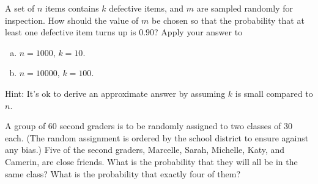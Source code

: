 \documentclass[12pt]{elegantbook}
\begin{document}
\begin{exercise*}[2]
    A set of $n$ items contains $k$ defective items, and $m$ are sampled randomly for inspection. How should the value of $m$ be chosen so that the probability that at least one defective item turns up is $0.90$? Apply your answer to 
    \begin{enumerate}[(a)]
        \item $n=1000$, $k=10$. 
        \item $n=10000$, $k=100$.
    \end{enumerate}
    Hint: It's ok to derive an approximate answer by assuming $k$ is small compared to $n$. 
\end{exercise*}

\begin{exercise*}[3]
    A group of $60$ second graders is to be randomly assigned to two classes of $30$ each. (The random assignment is ordered by the school district to ensure against any bias.) Five of the second graders, Marcelle, Sarah, Michelle, Katy, and Camerin, are close friends. What is the probability that they will all be in the same class? What is the probability that exactly four of them? 
\end{exercise*}
\end{document}
